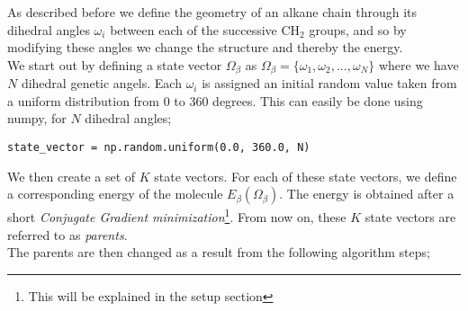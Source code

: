 \documentclass{article}
\begin{document}
As described before we define the geometry of an alkane chain through its
dihedral angles $\omega_i$ between each of the successive CH$_2$ groups,
and so by modifying these angles we change the structure and thereby the energy.\\


We start out by defining a state vector $\Omega_\beta$ as
$\Omega_\beta = \{ \omega_1, \omega_2, ... , \omega_N \}$
where we have $N$ dihedral genetic angels.
Each $\omega_i$ is assigned an initial random value taken
from a uniform distribution
from 0 to 360 degrees. This can easily be done using
numpy, for $N$ dihedral angles;

\begin{lstlisting}
state_vector = np.random.uniform(0.0, 360.0, N)
\end{lstlisting}

We then create a set of $K$ state vectors.
For each of these state vectors,
we define a corresponding energy of the molecule $E_\beta(\Omega_\beta)$.
The energy is obtained after a short
{\em Conjugate Gradient minimization}\footnote{This will be explained in the setup section}.
From now on, these $K$ state vectors are referred to as \emph{parents}.\\

The parents are then changed as a result from the following algorithm steps;
\end{document}
